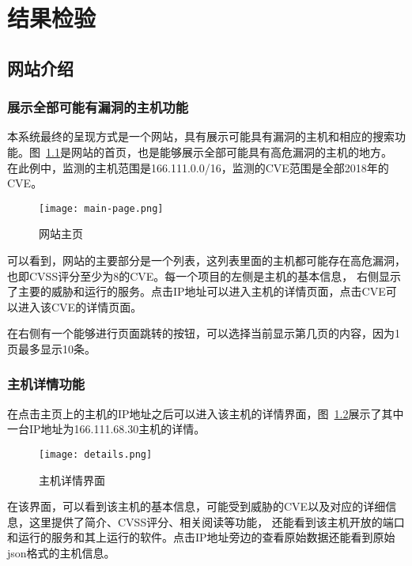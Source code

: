 \chapter{结果检验}
\label{cha:results}

\section{网站介绍}
\label{chap:website-intro}

\subsection{展示全部可能有漏洞的主机功能}
\label{sec:show-all}

本系统最终的呈现方式是一个网站，具有展示可能具有漏洞的主机和相应的搜索功能。图~\ref{fig:main-page}是网站的首页，也是能够展示全部可能具有高危漏洞的主机的地方。
在此例中，监测的主机范围是166.111.0.0/16，监测的CVE范围是全部2018年的CVE。

\begin{figure}[H]
    \centering
    \texttt{[image: main-page.png]}
    \caption{网站主页}
    \label{fig:main-page}
\end{figure}

可以看到，网站的主要部分是一个列表，这列表里面的主机都可能存在高危漏洞，也即CVSS评分至少为8的CVE。每一个项目的左侧是主机的基本信息，
右侧显示了主要的威胁和运行的服务。点击IP地址可以进入主机的详情页面，点击CVE可以进入该CVE的详情页面。

在右侧有一个能够进行页面跳转的按钮，可以选择当前显示第几页的内容，因为1页最多显示10条。

\subsection{主机详情功能}
\label{sec:details}

在点击主页上的主机的IP地址之后可以进入该主机的详情界面，图~\ref{fig:details}展示了其中一台IP地址为166.111.68.30主机的详情。

\begin{figure}[H]
    \centering
    \texttt{[image: details.png]}
    \caption{主机详情界面}
    \label{fig:details}
\end{figure}

在该界面，可以看到该主机的基本信息，可能受到威胁的CVE以及对应的详细信息，这里提供了简介、CVSS评分、相关阅读等功能，
还能看到该主机开放的端口和运行的服务和其上运行的软件。点击IP地址旁边的查看原始数据还能看到原始json格式的主机信息。

